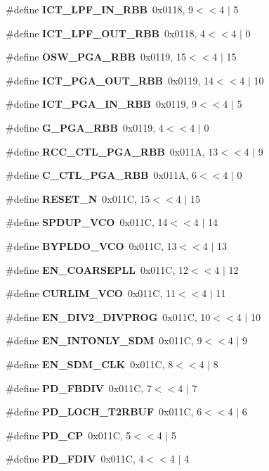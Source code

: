 \begin{DoxyCompactItemize}
\item 
\#define {\bf I\+C\+T\+\_\+\+L\+P\+F\+\_\+\+I\+N\+\_\+\+R\+BB}~0x0118, 9$<$$<$4 $\vert$  5
\item 
\#define {\bf I\+C\+T\+\_\+\+L\+P\+F\+\_\+\+O\+U\+T\+\_\+\+R\+BB}~0x0118, 4$<$$<$4 $\vert$  0
\item 
\#define {\bf O\+S\+W\+\_\+\+P\+G\+A\+\_\+\+R\+BB}~0x0119, 15$<$$<$4 $\vert$  15
\item 
\#define {\bf I\+C\+T\+\_\+\+P\+G\+A\+\_\+\+O\+U\+T\+\_\+\+R\+BB}~0x0119, 14$<$$<$4 $\vert$  10
\item 
\#define {\bf I\+C\+T\+\_\+\+P\+G\+A\+\_\+\+I\+N\+\_\+\+R\+BB}~0x0119, 9$<$$<$4 $\vert$  5
\item 
\#define {\bf G\+\_\+\+P\+G\+A\+\_\+\+R\+BB}~0x0119, 4$<$$<$4 $\vert$  0
\item 
\#define {\bf R\+C\+C\+\_\+\+C\+T\+L\+\_\+\+P\+G\+A\+\_\+\+R\+BB}~0x011\+A, 13$<$$<$4 $\vert$  9
\item 
\#define {\bf C\+\_\+\+C\+T\+L\+\_\+\+P\+G\+A\+\_\+\+R\+BB}~0x011\+A, 6$<$$<$4 $\vert$  0
\item 
\#define {\bf R\+E\+S\+E\+T\+\_\+N}~0x011\+C, 15$<$$<$4 $\vert$  15
\item 
\#define {\bf S\+P\+D\+U\+P\+\_\+\+V\+CO}~0x011\+C, 14$<$$<$4 $\vert$  14
\item 
\#define {\bf B\+Y\+P\+L\+D\+O\+\_\+\+V\+CO}~0x011\+C, 13$<$$<$4 $\vert$  13
\item 
\#define {\bf E\+N\+\_\+\+C\+O\+A\+R\+S\+E\+P\+LL}~0x011\+C, 12$<$$<$4 $\vert$  12
\item 
\#define {\bf C\+U\+R\+L\+I\+M\+\_\+\+V\+CO}~0x011\+C, 11$<$$<$4 $\vert$  11
\item 
\#define {\bf E\+N\+\_\+\+D\+I\+V2\+\_\+\+D\+I\+V\+P\+R\+OG}~0x011\+C, 10$<$$<$4 $\vert$  10
\item 
\#define {\bf E\+N\+\_\+\+I\+N\+T\+O\+N\+L\+Y\+\_\+\+S\+DM}~0x011\+C, 9$<$$<$4 $\vert$  9
\item 
\#define {\bf E\+N\+\_\+\+S\+D\+M\+\_\+\+C\+LK}~0x011\+C, 8$<$$<$4 $\vert$  8
\item 
\#define {\bf P\+D\+\_\+\+F\+B\+D\+IV}~0x011\+C, 7$<$$<$4 $\vert$  7
\item 
\#define {\bf P\+D\+\_\+\+L\+O\+C\+H\+\_\+\+T2\+R\+B\+UF}~0x011\+C, 6$<$$<$4 $\vert$  6
\item 
\#define {\bf P\+D\+\_\+\+CP}~0x011\+C, 5$<$$<$4 $\vert$  5
\item 
\#define {\bf P\+D\+\_\+\+F\+D\+IV}~0x011\+C, 4$<$$<$4 $\vert$  4
\item 

\end{DoxyCompactItemize}
